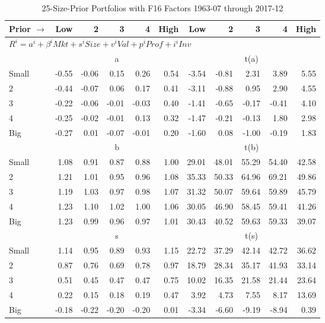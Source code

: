 
\begin{table}[H]
\footnotesize
\centering
\caption{25-Size-Prior Portfolios with F16 Factors 1963-07 through 2017-12}
\begin{tabular}{lrrrrrrrrrr}
  \toprule
    
    Prior $\rightarrow$ & Low & 2 & 3 & 4 & High & Low & 2 & 3 & 4 & High  \\ 
  \midrule
  \multicolumn{11}{l}{$R^i=a^i+\beta^iMkt+s^iSize+v^iVal+p^iProf+i^iInv$}  \\
  
     & \multicolumn{5}{c}{a} & \multicolumn{5}{c}{t(a)}   \\
     \cmidrule(r){2-6} \cmidrule(r){7-11} 
    Small  & -0.55  & -0.06  & 0.15  & 0.26  & 0.54  & -3.54  & -0.81  & 2.31  & 3.89  & 5.55   \\
    2  & -0.44  & -0.07  & 0.06  & 0.17  & 0.41  & -3.11  & -0.88  & 0.95  & 2.90  & 4.55   \\
    3  & -0.22  & -0.06  & -0.01  & -0.03  & 0.40  & -1.41  & -0.65  & -0.17  & -0.41  & 4.10   \\
    4  & -0.25  & -0.02  & -0.01  & 0.13  & 0.32  & -1.47  & -0.21  & -0.13  & 1.80  & 2.98   \\
    Big  & -0.27  & 0.01  & -0.07  & -0.01  & 0.20  & -1.60  & 0.08  & -1.00  & -0.19  & 1.83   \\
    
  
     & \multicolumn{5}{c}{b} & \multicolumn{5}{c}{t(b)}   \\
     \cmidrule(r){2-6} \cmidrule(r){7-11} 
    Small  & 1.08  & 0.91  & 0.87  & 0.88  & 1.00  & 29.01  & 48.01  & 55.29  & 54.40  & 42.58   \\
    2  & 1.21  & 1.01  & 0.95  & 0.96  & 1.08  & 35.33  & 50.33  & 64.96  & 69.21  & 49.86   \\
    3  & 1.19  & 1.03  & 0.97  & 0.98  & 1.07  & 31.32  & 50.07  & 59.64  & 59.89  & 45.79   \\
    4  & 1.23  & 1.10  & 1.02  & 1.00  & 1.06  & 30.05  & 46.90  & 58.45  & 59.41  & 41.26   \\
    Big  & 1.23  & 0.99  & 0.96  & 0.97  & 1.01  & 30.43  & 40.52  & 59.63  & 59.33  & 39.07   \\
    
  
     & \multicolumn{5}{c}{s} & \multicolumn{5}{c}{t(s)}   \\
     \cmidrule(r){2-6} \cmidrule(r){7-11} 
    Small  & 1.14  & 0.95  & 0.89  & 0.93  & 1.15  & 22.72  & 37.29  & 42.14  & 42.72  & 36.62   \\
    2  & 0.87  & 0.76  & 0.69  & 0.78  & 0.97  & 18.79  & 28.34  & 35.17  & 41.93  & 33.14   \\
    3  & 0.51  & 0.45  & 0.47  & 0.47  & 0.75  & 10.02  & 16.35  & 21.58  & 21.44  & 23.64   \\
    4  & 0.22  & 0.15  & 0.18  & 0.19  & 0.47  & 3.92  & 4.73  & 7.55  & 8.17  & 13.69   \\
    Big  & -0.18  & -0.22  & -0.20  & -0.20  & 0.01  & -3.34  & -6.60  & -9.19  & -8.94  & 0.39   \\
    

\end{tabular}
\end{table}
